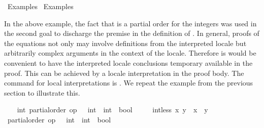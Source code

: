 %
\begin{isabellebody}%
\def\isabellecontext{Examples{\isadigit{3}}}%
%
\isadelimtheory
%
\endisadelimtheory
%
\isatagtheory
{}\isamarkupfalse%
\ Examples{}\isanewline
{}\ Examples\isanewline
{}%
\endisatagtheory
{\isafoldtheory}%
%
\isadelimtheory
%
\endisadelimtheory
%
\begin{isamarkuptext}%
\vspace{-5ex}%
\end{isamarkuptext}%
\isamarkuptrue%
%
\isamarkuptrue%
%
\begin{isamarkuptext}%
In the above example, the fact that  is a partial
  order for the integers was used in the second goal to
  discharge the premise in the definition of .  In
  general, proofs of the equations not only may involve definitions
  from the interpreted locale but arbitrarily complex arguments in the
  context of the locale.  Therefore is would be convenient to have the
  interpreted locale conclusions temporary available in the proof.
  This can be achieved by a locale interpretation in the proof body.
  The command for local interpretations is .  We
  repeat the example from the previous section to illustrate this.%
\end{isamarkuptext}%
\isamarkuptrue%
%
\isadelimvisible
\ \ %
\endisadelimvisible
%
\isatagvisible
{}\isamarkupfalse%
\ int{}\ partial{}order\ {}op\ {}\ {}{}\ int\ {}\ int\ {}\ bool{}\isanewline
\ \ \ \ \ {}int{}less\ x\ y\ {}\ {}x\ {}\ y{}{}\isanewline
\ \ \isamarkupfalse%
\ {}\isanewline
\ \ \ \ \isamarkupfalse%
\ {}partial{}order\ {}op\ {}\ {}{}\ int\ {}\ int\ {}\ bool{}{}\isanewline

\end{isabellebody}
